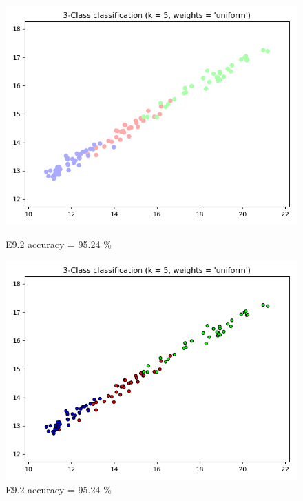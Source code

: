 \documentclass{classrep}
\begin{document}
\begin{figure}[H]
			\begin{minipage}{0.5\linewidth}
				\centering
				\includegraphics[scale=0.25]{KNN_seed_9_3.png}
				\caption{E9.2 accuracy = 95.24 \%}
				\label{E9.2}
			\end{minipage}
			\begin{minipage}{0.5\linewidth}
				\centering
				\includegraphics[scale=0.25]{KNN_seed_9_4.png}
				\caption{E9.2 accuracy = 95.24 \%}
				\label{E9.2}
			\end{minipage}
			\begin{minipage}{0.5\linewidth}
				\centering

\end{minipage}
\end{figure}
\end{document}
